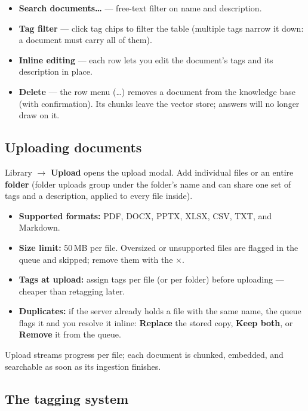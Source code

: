 \documentclass[11pt,letterpaper]{article}
\begin{document}
\begin{itemize}
  \item \textbf{Search documents\ldots} --- free-text filter on name and
        description.
  \item \textbf{Tag filter} --- click tag chips to filter the table (multiple
        tags narrow it down: a document must carry all of them).
  \item \textbf{Inline editing} --- each row lets you edit the document's
        tags and its description in place.
  \item \textbf{Delete} --- the row menu (\ldots) removes a document from the
        knowledge base (with confirmation). Its chunks leave the vector
        store; answers will no longer draw on it.
\end{itemize}

\subsection{Uploading documents}

Library $\rightarrow$ \textbf{Upload} opens the upload modal. Add individual
files or an entire \textbf{folder} (folder uploads group under the folder's
name and can share one set of tags and a description, applied to every file
inside).

\begin{itemize}
  \item \textbf{Supported formats:} PDF, DOCX, PPTX, XLSX, CSV, TXT, and
        Markdown.
  \item \textbf{Size limit:} 50\,MB per file. Oversized or unsupported files
        are flagged in the queue and skipped; remove them with the
        $\times$.
  \item \textbf{Tags at upload:} assign tags per file (or per folder) before
        uploading --- cheaper than retagging later.
  \item \textbf{Duplicates:} if the server already holds a file with the same
        name, the queue flags it and you resolve it inline:
        \textbf{Replace} the stored copy, \textbf{Keep both}, or
        \textbf{Remove} it from the queue.
\end{itemize}

Upload streams progress per file; each document is chunked, embedded, and
searchable as soon as its ingestion finishes.

\subsection{The tagging system}
\end{document}
